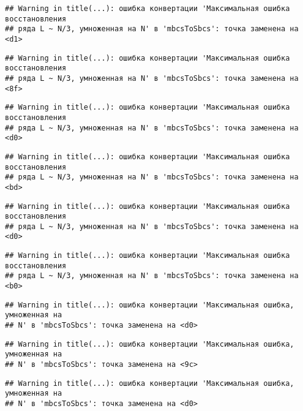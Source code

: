 \documentclass[
]{article}
\begin{document}
\begin{verbatim}
## Warning in title(...): ошибка конвертации 'Максимальная ошибка восстановления
## ряда L ~ N/3, умноженная на N' в 'mbcsToSbcs': точка заменена на <d1>
\end{verbatim}

\begin{verbatim}
## Warning in title(...): ошибка конвертации 'Максимальная ошибка восстановления
## ряда L ~ N/3, умноженная на N' в 'mbcsToSbcs': точка заменена на <8f>
\end{verbatim}

\begin{verbatim}
## Warning in title(...): ошибка конвертации 'Максимальная ошибка восстановления
## ряда L ~ N/3, умноженная на N' в 'mbcsToSbcs': точка заменена на <d0>
\end{verbatim}

\begin{verbatim}
## Warning in title(...): ошибка конвертации 'Максимальная ошибка восстановления
## ряда L ~ N/3, умноженная на N' в 'mbcsToSbcs': точка заменена на <bd>
\end{verbatim}

\begin{verbatim}
## Warning in title(...): ошибка конвертации 'Максимальная ошибка восстановления
## ряда L ~ N/3, умноженная на N' в 'mbcsToSbcs': точка заменена на <d0>
\end{verbatim}

\begin{verbatim}
## Warning in title(...): ошибка конвертации 'Максимальная ошибка восстановления
## ряда L ~ N/3, умноженная на N' в 'mbcsToSbcs': точка заменена на <b0>
\end{verbatim}

\begin{verbatim}
## Warning in title(...): ошибка конвертации 'Максимальная ошибка, умноженная на
## N' в 'mbcsToSbcs': точка заменена на <d0>
\end{verbatim}

\begin{verbatim}
## Warning in title(...): ошибка конвертации 'Максимальная ошибка, умноженная на
## N' в 'mbcsToSbcs': точка заменена на <9c>
\end{verbatim}

\begin{verbatim}
## Warning in title(...): ошибка конвертации 'Максимальная ошибка, умноженная на
## N' в 'mbcsToSbcs': точка заменена на <d0>
\end{verbatim}
\end{document}
